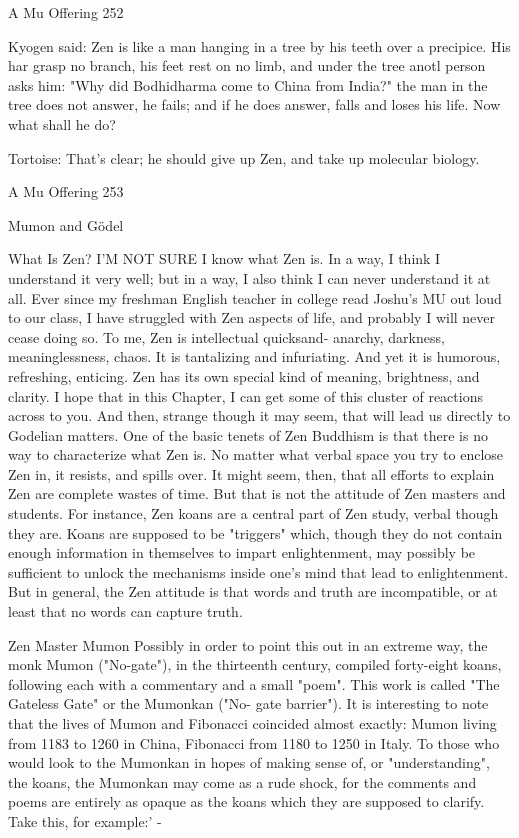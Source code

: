 A Mu Offering                                                                             252

   Kyogen said: Zen is like a man hanging in a tree by his teeth over a precipice. His
   har grasp no branch, his feet rest on no limb, and under the tree anotl person asks
   him: "Why did Bodhidharma come to China from India?" the man in the tree does
   not answer, he fails; and if he does answer, falls and loses his life. Now what shall
   he do?

Tortoise: That's clear; he should give up Zen, and take up molecular biology.




A Mu Offering                                                                          253


                            Mumon and Gödel

                                    What Is Zen?
I'M NOT SURE I know what Zen is. In a way, I think I understand it very well; but in a
way, I also think I can never understand it at all. Ever since my freshman English teacher
in college read Joshu's MU out loud to our class, I have struggled with Zen aspects of
life, and probably I will never cease doing so. To me, Zen is intellectual quicksand-
anarchy, darkness, meaninglessness, chaos. It is tantalizing and infuriating. And yet it is
humorous, refreshing, enticing. Zen has its own special kind of meaning, brightness, and
clarity. I hope that in this Chapter, I can get some of this cluster of reactions across to
you. And then, strange though it may seem, that will lead us directly to Godelian matters.
         One of the basic tenets of Zen Buddhism is that there is no way to characterize
what Zen is. No matter what verbal space you try to enclose Zen in, it resists, and spills
over. It might seem, then, that all efforts to explain Zen are complete wastes of time. But
that is not the attitude of Zen masters and students. For instance, Zen koans are a central
part of Zen study, verbal though they are. Koans are supposed to be "triggers" which,
though they do not contain enough information in themselves to impart enlightenment,
may possibly be sufficient to unlock the mechanisms inside one's mind that lead to
enlightenment. But in general, the Zen attitude is that words and truth are incompatible,
or at least that no words can capture truth.

Zen Master Mumon
Possibly in order to point this out in an extreme way, the monk Mumon ("No-gate"), in
the thirteenth century, compiled forty-eight koans, following each with a commentary
and a small "poem". This work is called "The Gateless Gate" or the Mumonkan ("No-
gate barrier"). It is interesting to note that the lives of Mumon and Fibonacci coincided
almost exactly: Mumon living from 1183 to 1260 in China, Fibonacci from 1180 to 1250
in Italy. To those who would look to the Mumonkan in hopes of making sense of, or
"understanding", the koans, the Mumonkan may come as a rude shock, for the comments
and poems are entirely as opaque as the koans which they are supposed to clarify. Take
this, for example:' -




